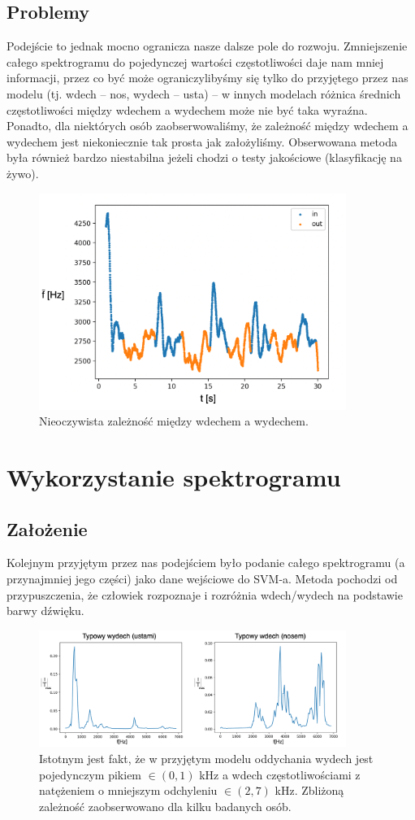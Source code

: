 \documentclass[polish]{article}
\begin{document}
\subsection{Problemy}
Podejście to jednak mocno ogranicza nasze dalsze pole do rozwoju.  Zmniejszenie całego 
spektrogramu do pojedynczej wartości częstotliwości daje nam mniej informacji, przez co 
być może ograniczylibyśmy się tylko do przyjętego przez nas modelu (tj.  wdech -- nos, wydech -- usta) -- w innych
modelach różnica średnich częstotliwości między wdechem a wydechem może nie być taka wyraźna.  Ponadto, dla niektórych osób zaobserwowaliśmy, 
że zależność między wdechem a wydechem jest niekoniecznie tak prosta jak założyliśmy. Obserwowana metoda
była również bardzo niestabilna jeżeli chodzi o testy jakościowe (klasyfikację na żywo).
\begin{figure}[H]
	\centering
	\includegraphics[width=10cm]{problem_srednie_ozn}
	\caption{Nieoczywista zależność między wdechem a wydechem.}
\end{figure}

\section{Wykorzystanie spektrogramu}
\subsection{Założenie}
Kolejnym przyjętym przez nas podejściem było podanie całego spektrogramu (a przynajmniej jego części) jako dane wejściowe do SVM-a.  
Metoda pochodzi od przypuszczenia, że człowiek rozpoznaje i rozróżnia wdech/wydech
na podstawie barwy dźwięku.  
\begin{figure}[H]
	\centering
	\includegraphics[width=10cm]{wdech_wydech_spektro}
  	\caption{Istotnym jest fakt, że w przyjętym modelu oddychania wydech
jest pojedynczym pikiem $\in (0, 1)$ kHz a wdech częstotliwościami z natężeniem
o mniejszym odchyleniu $\in (2, 7)$ kHz.  Zbliżoną zależność zaobserwowano dla kilku badanych osób.}
\end{figure}
\end{document}
